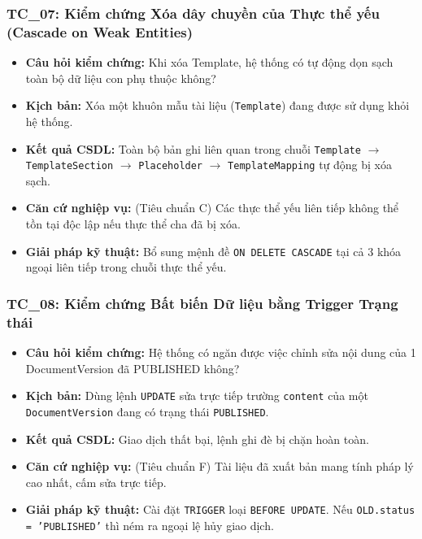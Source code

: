 \subsubsection*{TC\_07: Kiểm chứng Xóa dây chuyền của Thực thể yếu (Cascade on Weak Entities)}
\begin{itemize}
    \item \textbf{Câu hỏi kiểm chứng:} Khi xóa Template, hệ thống có tự động dọn sạch toàn bộ dữ liệu con phụ thuộc không?
    \item \textbf{Kịch bản:} Xóa một khuôn mẫu tài liệu (\texttt{Template}) đang được sử dụng khỏi hệ thống.
    \item \textbf{Kết quả CSDL:} Toàn bộ bản ghi liên quan trong chuỗi \texttt{Template} $\rightarrow$ \texttt{TemplateSection} $\rightarrow$ \texttt{Placeholder} $\rightarrow$ \texttt{TemplateMapping} tự động bị xóa sạch.
    \item \textbf{Căn cứ nghiệp vụ:} (Tiêu chuẩn C) Các thực thể yếu liên tiếp không thể tồn tại độc lập nếu thực thể cha đã bị xóa.
    \item \textbf{Giải pháp kỹ thuật:} Bổ sung mệnh đề \texttt{ON DELETE CASCADE} tại cả 3 khóa ngoại liên tiếp trong chuỗi thực thể yếu.
\end{itemize}

\subsubsection*{TC\_08: Kiểm chứng Bất biến Dữ liệu bằng Trigger Trạng thái}
\begin{itemize}
    \item \textbf{Câu hỏi kiểm chứng:} Hệ thống có ngăn được việc chỉnh sửa nội dung của 1 DocumentVersion đã PUBLISHED không?
    \item \textbf{Kịch bản:} Dùng lệnh \texttt{UPDATE} sửa trực tiếp trường \texttt{content} của một \texttt{DocumentVersion} đang có trạng thái \texttt{PUBLISHED}.
    \item \textbf{Kết quả CSDL:} Giao dịch thất bại, lệnh ghi đè bị chặn hoàn toàn.
    \item \textbf{Căn cứ nghiệp vụ:} (Tiêu chuẩn F) Tài liệu đã xuất bản mang tính pháp lý cao nhất, cấm sửa trực tiếp.
    \item \textbf{Giải pháp kỹ thuật:} Cài đặt \texttt{TRIGGER} loại \texttt{BEFORE UPDATE}. Nếu \texttt{OLD.status = 'PUBLISHED'} thì ném ra ngoại lệ hủy giao dịch.
\end{itemize}

